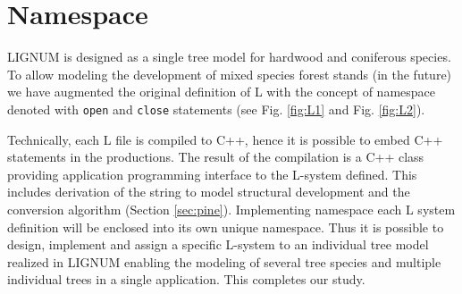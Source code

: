 \section{Namespace}
LIGNUM is designed as a  single tree model for hardwood and coniferous
species.  To  allow modeling the  development of mixed  species forest
stands (in the future) we  have augmented the original definition of L
with  the   concept  of  namespace  denoted   with  \texttt{open}  and
\texttt{close}   statements   (see    Fig.   \ref{fig:L1}   and   Fig.
\ref{fig:L2}).
 
Technically, each L  file is compiled to C++, hence  it is possible to
embed C++ statements in the productions. The result of the compilation
is  a C++  class providing  application programming  interface  to the
L-system  defined. This  includes derivation  of the  string  to model
structural   development  and   the   conversion  algorithm   (Section
\ref{sec:pine}).  Implementing namespace each L system definition will
be  enclosed into its  own unique  namespace. Thus  it is  possible to
design, implement and assign a specific L-system to an individual tree
model realized in LIGNUM enabling the modeling of several tree species
and multiple individual trees  in a single application. This completes
our study.

